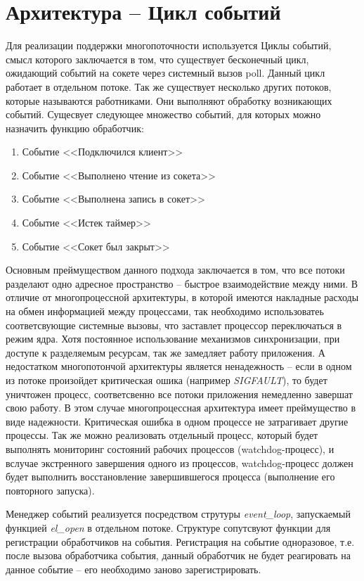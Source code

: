 \documentclass[a4paper,12pt]{report}
\begin{document}
	 \section{Архитектура -- Цикл событий}

    Для реализации поддержки многопоточности используется Циклы событий, смысл которого заключается в том, что существует бесконечный цикл, ожидающий событий на сокете через системный вызов poll. Данный цикл работает в отдельном потоке. Так же существует несколько других потоков, которые называются работниками. Они выполняют обработку возникающих событий. Сущесвует следующее множество событий, для которых можно назначить функцию обработчик:
    \begin{enumerate}
        \item Событие <<Подключился клиент>>
        \item Событие <<Выполнено чтение из сокета>>
        \item Событие <<Выполнена запись в сокет>>
        \item Событие <<Истек таймер>>
        \item Событие <<Сокет был закрыт>>
    \end{enumerate}
    
    Основным преймуществом данного подхода заключается в том, что все потоки разделают одно адресное пространство -- быстрое взаимодействие между ними. В отличие от многопроцессной архитектуры, в которой имеются накладные расходы на обмен информацией между процессами, так необходимо использоватеь соответсвующие системные вызовы, что заставлет процессор переключаться в режим ядра. Хотя постоянное использование механизмов синхронизации, при доступе к разделяемым ресурсам, так же замедляет работу приложения. А недостатком многопотончой архитектуры является ненадежность -- если в одном из потоке произойдет критическая ошика (например \textit{SIGFAULT}), то будет уничтожен процесс, соответсвенно все потоки приложения немедленно завершат свою работу. В этом случае многопроцессная архитектура имеет преймущество в виде надежности. Критическая ошибка в одном процессе не затрагивает другие процессы. Так же можно реализовать отдельный процесс, который будет выполнять мониторинг состояний рабочих процессов (watchdog-процесс), и вслучае экстренного завершения одного из процессов, watchdog-процесс должен будет выполнить восстановление завершившегося процесса (выполнение его повторного запуска). 
    
    Менеджер событий реализуется посредством струтуры \textit{event\_loop}, запускаемый функцией \textit{el\_open} в отдельном потоке. Структуре сопутсвуют функции для регистрации обработчиков на события. Регистрация на событие одноразовое, т.е. после вызова обработчика события, данный обработчик не будет реагировать на данное событие -- его необходимо заново зарегистрировать. 
    
\end{document}
